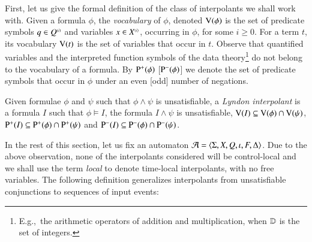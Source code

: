 First, let us give the formal definition of the class of interpolants
we shall work with. Given a formula $\phi$, the \emph{vocabulary} of
$\phi$, denoted $\mathrm{V}({\phi})$ is the set of predicate symbols $q \in
{Q}^{\scriptscriptstyle{({i})}}$ and variables $x \in {X}^{\scriptscriptstyle{({i})}}$, occurring in $\phi$,
for some $i\geq0$. For a term $t$, its vocabulary $\mathrm{V}({t})$ is the set
of variables that occur in $t$. Observe that quantified variables and
the interpreted function symbols of the data
theory\footnote{E.g.,\ the arithmetic operators of addition and
  multiplication, when $\mathbb{D}$ is the set of integers.}  do not belong
to the vocabulary of a formula. By $\mathrm{P}^{+}(\phi)$ [$\mathrm{P}^{-}(\phi)$]
we denote the set of predicate symbols that occur in $\phi$ under an
even [odd] number of negations.

\begin{definition}\label{def:lyndon-interpolant}
Given formulae $\phi$ and $\psi$ such that $\phi \wedge \psi$ is
unsatisfiable, a \emph{Lyndon interpolant} is a formula $I$ such that
$\phi \models I$, the formula $I \wedge \psi$ is unsatisfiable,
$\mathrm{V}({I}) \subseteq \mathrm{V}({\phi}) \cap \mathrm{V}({\psi})$, $\mathrm{P}^{+}(I) \subseteq
\mathrm{P}^{+}(\phi) \cap \mathrm{P}^{+}(\psi)$ and $\mathrm{P}^{-}(I) \subseteq
\mathrm{P}^{-}(\phi) \cap \mathrm{P}^{-}(\psi)$.
\end{definition}

In the rest of this section, let us fix an automaton $\mathcal{A} =
\langle \Sigma,X,Q,\iota,F,\Delta \rangle$. Due to the above observation, none
of the interpolants considered will be control-local and we shall use
the term \emph{local} to denote time-local interpolants, with no free
variables. The following definition generalizes interpolants from
unsatisfiable conjunctions to sequences of input events: 

